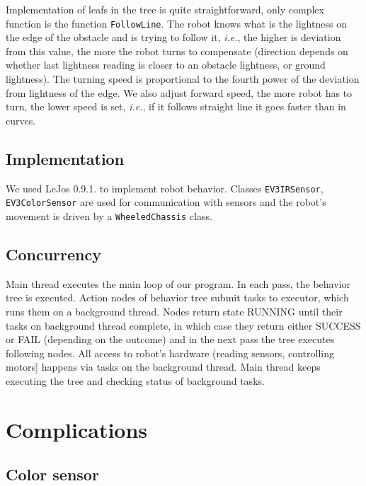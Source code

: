 \documentclass[a4paper]{article}
\newcommand{\ie}{\emph{i.e.}, }
\begin{document}
\smallskip
Implementation of leafs in the tree is quite straightforward, only complex function is the function \texttt{FollowLine}. The robot knows what is the lightness on the edge of the obstacle and is trying to follow it, \ie the higher is deviation from this value, the more the robot turns to compensate (direction depends on whether last lightness reading is closer to an obstacle lightness, or ground lightness). The turning speed is proportional to the fourth power of the deviation from lightness of the edge. We also adjust forward speed, the more robot has to turn, the lower speed is set, \ie if it follows straight line it goes faster than in curves. 

\subsection*{Implementation}
We used LeJos 0.9.1. to implement robot behavior. Classes \texttt{EV3IRSensor}, \texttt{EV3ColorSensor} are used for communication with sensors and the robot's movement is driven by a \texttt{WheeledChassis} class. 


\subsection*{Concurrency}
Main thread executes the main loop of our program. In each pass, the behavior tree is executed. Action nodes of behavior tree submit tasks to executor, which runs them on a background thread. Nodes return state RUNNING until their tasks on background thread complete, in which case they return either SUCCESS or FAIL (depending on the outcome) and in the next pass the tree executes following nodes. All access to robot's hardware (reading sensors, controlling motors] happens via tasks on the background thread. Main thread keeps executing the tree and checking status of background tasks.

\section*{Complications}
\subsection*{Color sensor} 
\end{document}
